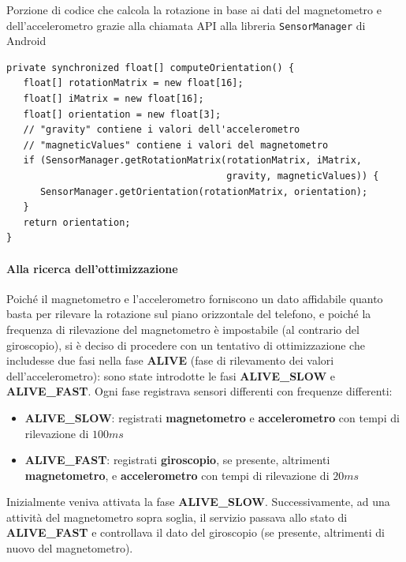 \documentclass[a4paper,10pt]{memoir}
\begin{document}
\begin{listing}[H]
\caption{Porzione di codice che calcola la rotazione in base ai dati del magnetometro e dell'accelerometro grazie alla chiamata API alla libreria \texttt{SensorManager} di Android}
\begin{verbatim}
private synchronized float[] computeOrientation() {
   float[] rotationMatrix = new float[16];
   float[] iMatrix = new float[16];
   float[] orientation = new float[3];
   // "gravity" contiene i valori dell'accelerometro
   // "magneticValues" contiene i valori del magnetometro
   if (SensorManager.getRotationMatrix(rotationMatrix, iMatrix,
                                       gravity, magneticValues)) {
      SensorManager.getOrientation(rotationMatrix, orientation);
   }
   return orientation;
}
\end{verbatim}
\end{listing}

\paragraph{Alla ricerca dell'ottimizzazione} Poiché il magnetometro e l'accelerometro forniscono un dato affidabile quanto basta per rilevare la rotazione sul piano orizzontale del telefono, e poiché la frequenza di rilevazione del magnetometro è impostabile (al contrario del giroscopio), si è deciso di procedere con un tentativo di ottimizzazione che includesse due fasi nella fase \textbf{ALIVE} (fase di rilevamento dei valori dell'accelerometro): sono state introdotte le fasi \textbf{ALIVE\_SLOW} e \textbf{ALIVE\_FAST}. Ogni fase registrava sensori differenti con frequenze differenti:

\begin{itemize}
\item \textbf{ALIVE\_SLOW}: registrati \textbf{magnetometro} e \textbf{accelerometro} con tempi di rilevazione di $100ms$
\item \textbf{ALIVE\_FAST}: registrati \textbf{giroscopio}, se presente, altrimenti \textbf{magnetometro}, e \textbf{accelerometro} con tempi di rilevazione di $20ms$
\end{itemize}

Inizialmente veniva attivata la fase \textbf{ALIVE\_SLOW}. Successivamente, ad una attività del magnetometro sopra soglia, il servizio passava allo stato di \textbf{ALIVE\_FAST} e controllava il dato del giroscopio (se presente, altrimenti di nuovo del magnetometro).
\end{document}
